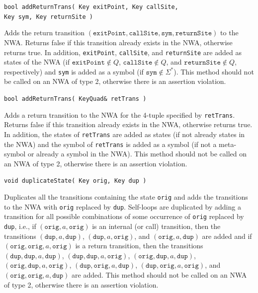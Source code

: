 \documentclass{llncs}
\begin{document}
\begin{description}
  \item\texttt{bool addReturnTrans( Key exitPoint, Key
    callSite,\\ \hspace*{3.25cm} Key sym, Key returnSite )} \nopagebreak

    Adds the return transition
    $(\texttt{exitPoint},\texttt{callSite},\texttt{sym},\texttt{returnSite})$
    to the NWA.  Returns false if this transition already exists in the NWA,
    otherwise returns true.  In addition, \texttt{exitPoint},
    \texttt{callSite}, and \texttt{returnSite} are added as states of the NWA
    (if $\texttt{exitPoint} \not\in Q$, $\texttt{callSite} \not\in Q$, and
    $\texttt{returnSite} \not\in Q$, respectively) and \texttt{sym} is added
    as a symbol (if $\texttt{sym} \not\in \Sigma^*$).  This method should not
    be called on an NWA of type 2, otherwise there is an assertion violation.

  \item\texttt{bool addReturnTrans( KeyQuad\& retTrans )} \nopagebreak

    Adds a return transition to the NWA for the 4-tuple specified by
    \texttt{retTrans}.  Returns false if this transition already exists in
    the NWA, otherwise returns true.  In addition, the states of
    \texttt{retTrans} are added as states (if not already states in the NWA)
    and the symbol of \texttt{retTrans} is added as a symbol (if not a
    meta-symbol or already a symbol in the NWA).  This method should not be
    called on an NWA of type 2, otherwise there is an assertion violation.

  \item\texttt{void duplicateState( Key orig, Key dup )} \nopagebreak

    Duplicates all the transitions containing the state \texttt{orig} and
    adds the transitions to the NWA with \texttt{orig} replaced by
    \texttt{dup}.  Self-loops are duplicated by adding a transition for all
    possible combinations of some occurrence of \texttt{orig} replaced by
    \texttt{dup}, i.e., if $(\texttt{orig},a,\texttt{orig})$ is an internal
    (or call) transition, then the transitions
    $(\texttt{dup},a,\texttt{dup})$, $(\texttt{dup},a,\texttt{orig})$, and
    $(\texttt{orig},a,\texttt{dup})$ are added and if
    $(\texttt{orig},\texttt{orig},a,\texttt{orig})$ is a return transition,
    then the transitions $(\texttt{dup},\texttt{dup},a,\texttt{dup})$,
    $(\texttt{dup},\texttt{dup},a,\texttt{orig})$,
    $(\texttt{orig},\texttt{dup},a,\texttt{dup})$,
    $(\texttt{orig},\texttt{dup},a,\texttt{orig})$,
    $(\texttt{dup},\texttt{orig},a,\texttt{dup})$,
    $(\texttt{dup},\texttt{orig},a,\texttt{orig})$, and
    $(\texttt{orig},\texttt{orig},a,\texttt{dup})$ are added.  This method
    should not be called on an NWA of type 2, otherwise there is an assertion
    violation.


\end{description}
\end{document}
